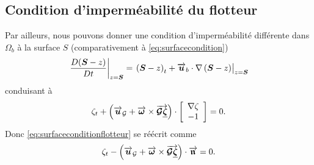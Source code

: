 \subsection{Condition d'imperméabilité du flotteur}

\noindent Par ailleurs, nous pouvons donner une condition d'imperméabilité différente dans $\Omega_b$ à la surface $S$ (comparativement à \eqref{eq:surfacecondition})
\begin{equation}
\left. \frac{D (\boldsymbol{S} - z)}{Dt} \right|_{z = \boldsymbol{S}} = \left. \left(\boldsymbol{S} - z\right)_t + \overrightarrow{\boldsymbol{u}}_b \cdot \nabla \left(\boldsymbol{S} - z\right) \right|_{z=\boldsymbol{S}}  \label{eq:surfaceconditionflotteur}
\end{equation}
conduisant à
\begin{equation}
\zeta_t + \left(\overrightarrow{\boldsymbol{u}}_\mathcal{G} + \overrightarrow{\boldsymbol{\omega}}\times \overrightarrow{\boldsymbol{\mathcal{G}\underline{\boldsymbol{\zeta}}}}\right) \cdot \left[\begin{array}{c} \nabla \zeta\\ -1\\  \end{array}\right] = 0.
\end{equation}
Donc \eqref{eq:surfaceconditionflotteur} se réécrit comme 
\begin{equation}
	\zeta_t - \left(\overrightarrow{\boldsymbol{u}}_\mathcal{G} + \overrightarrow{\boldsymbol{\omega}}\times \overrightarrow{\boldsymbol{\mathcal{G}\underline{\boldsymbol{\zeta}}}}\right) \cdot \overrightarrow{\boldsymbol{\mathfrak{n}}} = 0.\label{eq:surfaceflotteurcond}
\end{equation}

